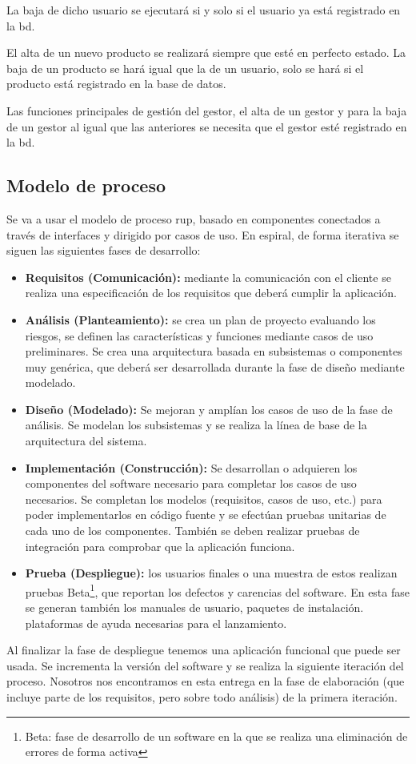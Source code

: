\noindent La baja de dicho usuario se ejecutará si y solo si el usuario ya está registrado en la \gls{bd}.

El alta de un nuevo producto se realizará siempre que esté en perfecto estado. La baja de un producto se hará igual que la de un usuario, solo se hará si el producto está registrado en la base de datos.

Las funciones principales de gestión del gestor, el alta de un gestor y para la baja de un gestor al igual que las anteriores se necesita que el gestor esté registrado en la \gls{bd}.

\subsection{Modelo de proceso}
Se va a usar el modelo de proceso \gls{rup}, basado en componentes conectados a través de interfaces y dirigido por casos de uso. En espiral, de forma iterativa se siguen las siguientes fases de desarrollo:
\begin{itemize}
	\item\textbf{Requisitos (Comunicación):} mediante la comunicación con el cliente se realiza una especificación de los requisitos que deberá cumplir la aplicación.
	\item\textbf{Análisis (Planteamiento):} se crea un plan de proyecto evaluando los riesgos, se definen las características y funciones mediante casos de uso preliminares. Se crea una arquitectura basada en subsistemas o componentes muy genérica, que deberá ser desarrollada durante la fase de diseño mediante modelado.
	\item\textbf{Diseño (Modelado):} Se mejoran y amplían los casos de uso de la fase de análisis. Se modelan los subsistemas y se realiza la línea de base de la arquitectura del sistema.
	\item\textbf{Implementación (Construcción): }Se desarrollan o adquieren los componentes del software necesario para completar los casos de uso necesarios. Se completan los modelos (requisitos, casos de uso, etc.) para poder implementarlos en código fuente y se efectúan pruebas unitarias de cada uno de los componentes. También se deben realizar pruebas de integración para comprobar que la aplicación funciona.
	\item\textbf{Prueba (Despliegue):} los usuarios finales o una muestra de estos realizan pruebas Beta\footnote{Beta: fase de desarrollo de un software en la que se realiza una eliminación de errores de forma activa}, que reportan los defectos y carencias del software. En esta fase se generan también los manuales de usuario, paquetes de instalación. plataformas de ayuda necesarias para el lanzamiento.
\end{itemize}

Al finalizar la fase de despliegue tenemos una aplicación funcional que puede ser usada. Se incrementa la versión del software y se realiza la siguiente iteración del proceso. Nosotros nos encontramos en esta entrega en la fase de elaboración (que incluye parte de los requisitos, pero sobre todo análisis) de la primera iteración.
